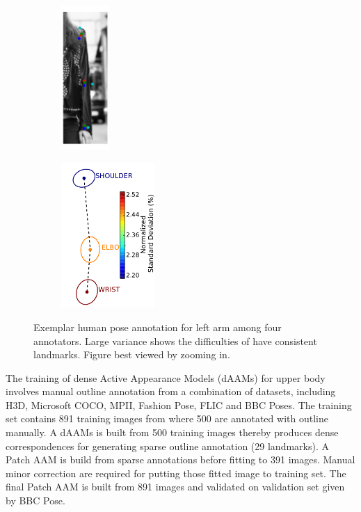 \begin{figure}[t!]
\begin{subfigure}[b]{0.08\textwidth}
    \end{subfigure}
  	\hfill
    \begin{subfigure}[b]{0.08\textwidth}
            \includegraphics[height=5.5cm]{resources/Fig_Variance/image_6}
    \end{subfigure}
    \hfill
    \begin{subfigure}[b]{0.125\textwidth}
            \includegraphics[height=5.5cm]{resources/Fig_Variance/variances}
    \end{subfigure}
    \caption{Exemplar human pose annotation for left arm among four annotators. Large variance shows the difficulties of have consistent landmarks. Figure best viewed by zooming in.}
    \label{fig:variance}
\end{figure}

The training of dense Active Appearance Models (dAAMs) for upper body involves manual outline annotation from a combination of datasets, including H3D\cite{PoseletsICCV09}, Microsoft COCO\cite{lin2014microsoft}, MPII\cite{andriluka14cvpr}, Fashion Pose\cite{dantone2013human}, FLIC\cite{sapp2013modec} and BBC Poses\cite{pfister2015flowing}. The training set contains 891 training images from where 500 are annotated with outline manually. A dAAMs is built from 500 training images thereby produces dense correspondences for generating sparse outline annotation (29 landmarks). A Patch AAM is build from sparse annotations before fitting to 391 images. Manual minor correction are required for putting those fitted image to training set. The final Patch AAM is built from 891 images and validated on validation set given by BBC Pose.


